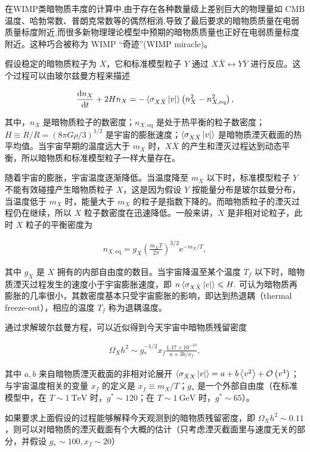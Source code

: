 \documentclass{beamer} %
\begin{document}
\begin{frame}
在WIMP类暗物质丰度的计算中,由于存在各种数量级上差别巨大的物理量如 CMB温度、哈勃常数、普朗克常数等的偶然相消,导致了最后要求的暗物质质量在电弱质量标度附近,而很多新物理理论模型中预期的暗物质质量也正好在电弱质量标度附近。这种巧合被称为 WIMP “奇迹”(WIMP miracle)。

假设稳定的暗物质粒子为 $X$，它和标准模型粒子 $Y$ 通过 $X\bar{X} \leftrightarrow Y\bar{Y}$ 进行反应。这个过程可以由玻尔兹曼方程来描述

\begin{align}
\frac{\mathrm{d}n_X }{\mathrm{d}t } + 2 H n_X 
=-\braket{\sigma_{X\bar{X}}\left|v \right|} \left(n_X^2 - n_{X,\mathrm{eq}}^2 \right),
\end{align}

其中，$n_X$ 是暗物质粒子的数密度；$n_{X,\mathrm{eq}}$ 是处于热平衡的粒子数密度；$H\equiv \dot{R}/R=\left(8\pi G \rho/3 \right)^{1/2}$ 是宇宙的膨胀速度；$\braket{\sigma_{X\bar{X}}\left|v \right|}$ 是暗物质湮灭截面的热平均值。当宇宙早期的温度远大于 $m_X$ 时，$X\bar{X}$ 的产生和湮灭过程达到动态平衡，所以暗物质和标准模型粒子一样大量存在。
\end{frame}

\begin{frame}
随着宇宙的膨胀，宇宙温度逐渐降低。当温度降至 $m_X$ 以下时，标准模型粒子 $Y$ 不能有效碰撞产生暗物质粒子 $X$，这是因为假设 $Y$ 按能量分布是玻尔兹曼分布，当温度低于 $m_X$ 时，能量大于 $m_X$ 的粒子是指数下降的。而暗物质粒子的湮灭过程仍在继续，所以 $X$ 粒子数密度在迅速降低。一般来讲，$X$ 是非相对论粒子，此时 $X$ 粒子的平衡密度为

\begin{align}
n_{X,\mathrm{eq}}
=g_X \left(\frac{m_X T}{2\pi }  \right)^{3/2} \mathrm{e}^{-m_X/T},
\end{align}

其中 $g_X$ 是 $X$ 拥有的内部自由度的数目。当宇宙降温至某个温度 $T_f$ 以下时，暗物质湮灭过程发生的速度小于宇宙膨胀速度，即 $n \Braket{\sigma_{X\bar{X}}\left|v \right|} \leqslant H .$ 可认为暗物质再膨胀的几率很小，其数密度基本只受宇宙膨胀的影响，即达到热退耦（thermal freeze-out），相应的温度 $T_f$ 称为退耦温度。
\end{frame}

\begin{frame}
通过求解玻尔兹曼方程，可以近似得到今天宇宙中暗物质残留密度

\begin{align}
\Omega_X h^2 \sim g_*^{-1/2} x_f \frac{1.17\times 10^{-10} }{a+3b/x_f }, 
\end{align}

其中 $a,b$ 来自暗物质湮灭截面的非相对论展开 $\Braket{\sigma_{\bar{X}X}\left|v \right|}=a+b\Braket{v^2}+\mathcal{O}\left(v^4 \right)$；与宇宙温度相关的变量 $x_f$ 的定义是 $x_f\equiv m_X/T$；$g_*$ 是一个外部自由度（在标准模型中，在 $T\sim 1~\mathrm{TeV}$ 时，$g^*\sim 120$；在 $T\sim 1~\mathrm{GeV}$ 时，$g^*\sim 65$）。

如果要求上面假设的过程能够解释今天观测到的暗物质残留密度，即 $\Omega_X h^2 \sim 0.11$，则可以对暗物质的湮灭截面有个大概的估计（只考虑湮灭截面里与速度无关的部分，并假设 $g_*\sim 100,x_f\sim 20$）
\end{frame}
\end{document}
